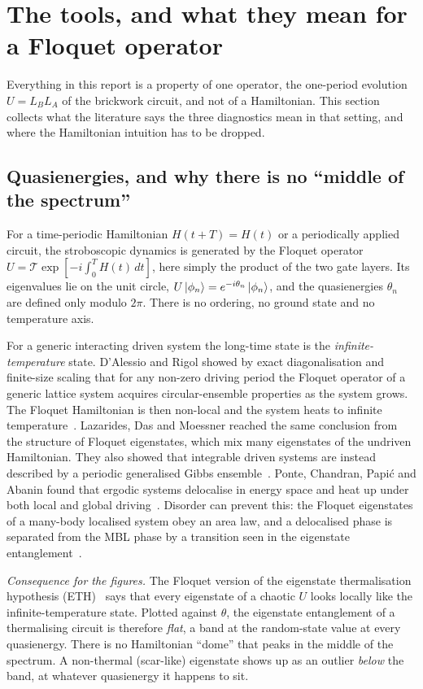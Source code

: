 \section{The tools, and what they mean for a Floquet operator}
\label{sec:lit}

Everything in this report is a property of one operator, the one-period
evolution $U=L_BL_A$ of the brickwork circuit, and not of a Hamiltonian. This
section collects what the literature says the three diagnostics mean in that
setting, and where the Hamiltonian intuition has to be dropped.

\subsection{Quasienergies, and why there is no ``middle of the spectrum''}

For a time-periodic Hamiltonian $H(t+T)=H(t)$ or a periodically applied circuit,
the stroboscopic dynamics is generated by the Floquet operator
$U=\mathcal{T}\exp[-i\int_0^T H(t)\,dt]$, here simply the product of the two
gate layers. Its eigenvalues lie on the unit circle,
$U\ket{\phi_n}=e^{-i\theta_n}\ket{\phi_n}$, and the quasienergies $\theta_n$ are
defined only modulo $2\pi$. There is no ordering, no ground state and no
temperature axis.

For a generic interacting driven system the long-time state is the
\emph{infinite-temperature} state. D'Alessio and Rigol showed by exact
diagonalisation and finite-size scaling that for any non-zero driving period the
Floquet operator of a generic lattice system acquires circular-ensemble
properties as the system grows. The Floquet Hamiltonian is then non-local and
the system heats to infinite temperature~\cite{dalessio2014}. Lazarides, Das and
Moessner reached the same conclusion from the structure of Floquet eigenstates,
which mix many eigenstates of the undriven Hamiltonian. They also showed that
integrable driven systems are instead described by a periodic generalised Gibbs
ensemble~\cite{lazarides2014}. Ponte, Chandran, Papi\'c and Abanin found that
ergodic systems delocalise in energy space and heat up under both local and
global driving~\cite{ponte2015annphys}. Disorder can prevent this: the Floquet
eigenstates of a many-body localised system obey an area law, and a delocalised
phase is separated from the MBL phase by a transition seen in the eigenstate
entanglement~\cite{ponte2015prl}.

\emph{Consequence for the figures.} The Floquet version of the eigenstate
thermalisation hypothesis
(ETH)~\cite{deutsch1991,srednicki1994,rigol2008,dalessio2016} says that every
eigenstate of a chaotic $U$ looks locally like the infinite-temperature state.
Plotted against $\theta$, the eigenstate entanglement of a thermalising circuit
is therefore \emph{flat}, a band at the random-state value at every
quasienergy. There is no Hamiltonian ``dome'' that peaks in the middle of the
spectrum. A non-thermal (scar-like) eigenstate shows up as an outlier
\emph{below} the band, at whatever quasienergy it happens to sit.

